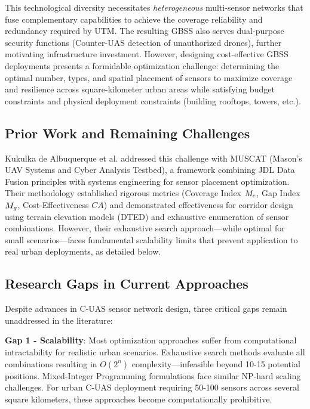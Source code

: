 This technological diversity necessitates \textit{heterogeneous} multi-sensor networks that fuse complementary capabilities to achieve the coverage reliability and redundancy required by UTM. The resulting GBSS also serves dual-purpose security functions (Counter-UAS detection of unauthorized drones), further motivating infrastructure investment. However, designing cost-effective GBSS deployments presents a formidable optimization challenge: determining the optimal number, types, and spatial placement of sensors to maximize coverage and resilience across square-kilometer urban areas while satisfying budget constraints and physical deployment constraints (building rooftops, towers, etc.).

\subsection{Prior Work and Remaining Challenges}

Kukulka de Albuquerque et al. \cite{muscat2023} addressed this challenge with MUSCAT (Mason's UAV Systems and Cyber Analysis Testbed), a framework combining JDL Data Fusion principles with systems engineering for sensor placement optimization. Their methodology established rigorous metrics (Coverage Index $M_c$, Gap Index $M_g$, Cost-Effectiveness $CA$) and demonstrated effectiveness for corridor design using terrain elevation models (DTED) and exhaustive enumeration of sensor combinations. However, their exhaustive search approach—while optimal for small scenarios—faces fundamental scalability limits that prevent application to real urban deployments, as detailed below.

\subsection{Research Gaps in Current Approaches}

Despite advances in C-UAS sensor network design, three critical gaps remain unaddressed in the literature:

\textbf{Gap 1 - Scalability}: Most optimization approaches suffer from computational intractability for realistic urban scenarios. Exhaustive search methods \cite{muscat2023} evaluate all combinations resulting in $O(2^n)$ complexity—infeasible beyond 10-15 potential positions. Mixed-Integer Programming formulations \cite{aievola2022ground} face similar NP-hard scaling challenges. For urban C-UAS deployment requiring 50-100 sensors across several square kilometers, these approaches become computationally prohibitive.


